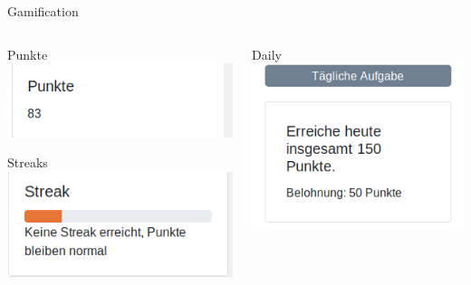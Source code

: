 \documentclass[xcolor=dvipsnames]{beamer}
\begin{document}
    \begin{frame}{Gamification}
         \begin{columns}
            \begin{column}{0.5\textwidth}
                \begin{block}{Punkte}
                    \center
                    \includegraphics[width=(\textwidth / 2)]{img/points.png}
                \end{block}
                \begin{block}{Streaks}
                    \center
                    \includegraphics[width=(\textwidth / 2)]{img/streak.png}
                \end{block}
            \end{column}
            \begin{column}{0.5\textwidth}
                \begin{block}{Daily}
                    \center
                    \includegraphics[width=(\textwidth / 2)]{img/daily.png}
                \end{block}
            \end{column}
        \end{columns}

    \end{frame}
\end{document}

